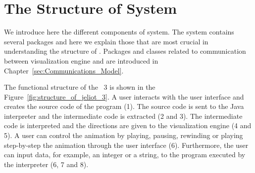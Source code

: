 \section{The Structure of \jel{} System}
\label{sec:The_Components_of_the_Jeliot_3_System}

We introduce here the different components of \jel{} system. The
system contains several packages and here we explain those that
are most crucial in understanding the structure of \jel{}.
Packages and classes related to communication between
visualization engine and \djava{} are introduced in
Chapter~\ref{sec:Communications_Model}.

The functional structure of the \jel{}~3 is shown in the
Figure~\ref{fig:structure_of_jeliot_3}. A user interacts with the
user interface and creates the source code of the program (1). The
source code is sent to the Java interpreter and the intermediate
code is extracted (2 and 3). The intermediate code is interpreted
and the directions are given to the visualization engine (4 and
5). A user can control the animation by playing, pausing,
rewinding or playing step-by-step the animation through the user
interface (6). Furthermore, the user can input data, for example,
an integer or a string, to the program executed by the interpreter
(6, 7 and 8).

